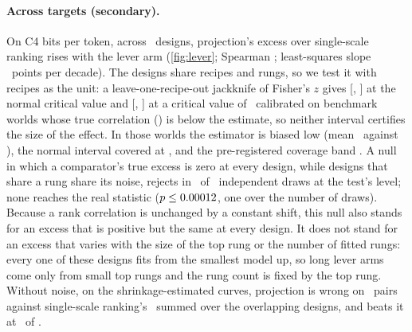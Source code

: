 \documentclass{article}
\begin{document}
\paragraph{Across targets (secondary).} On C4 bits per token, across \doseDesigns\ designs, projection's
excess over single-scale ranking rises with the lever arm (\cref{fig:lever};
Spearman \leverRealRho; least-squares slope \phNestedSlope\ points per decade).
The designs share recipes and rungs, so we test it
with recipes as the unit: a leave-one-recipe-out jackknife of Fisher's $z$ gives
[\leverWaldLow, \leverWaldHigh] at the normal critical value and
[\leverRealLow, \leverRealHigh] at a critical value of \leverK\ calibrated on
benchmark worlds whose true correlation (\leverRhoTrue) is below the estimate,
so neither interval certifies the size of the effect. In those worlds the
estimator is biased low (mean \leverCalMeanRhoHat\ against \leverRhoTrue), the
normal interval covered at \leverCalCovWald, and the pre-registered coverage
band \leverCalCovPred. A null in which a comparator's true excess is zero at
every design, while designs that share a rung share its noise, rejects in
\leverNullRate\ of \leverNullN\ independent draws at the test's level; none
reaches the real statistic ($p\le0.00012$, one over the number of draws). Because a rank correlation is unchanged by a constant
shift, this null also stands for an excess that is positive but the same at
every design. It does not stand for an excess that varies with the size of the
top rung or the number of fitted rungs: every one of these designs fits from the
smallest model up, so long lever arms come only from small top rungs and the rung
count is fixed by the top rung. Without noise, on the shrinkage-estimated
curves, projection is wrong on \mechNoiselessProjWrong\ pairs against
single-scale ranking's \mechNoiselessSingleWrong\ summed over the overlapping
designs, and beats it at \mechNoiselessProjBeats\ of \mechNoiselessDesigns.
\end{document}
